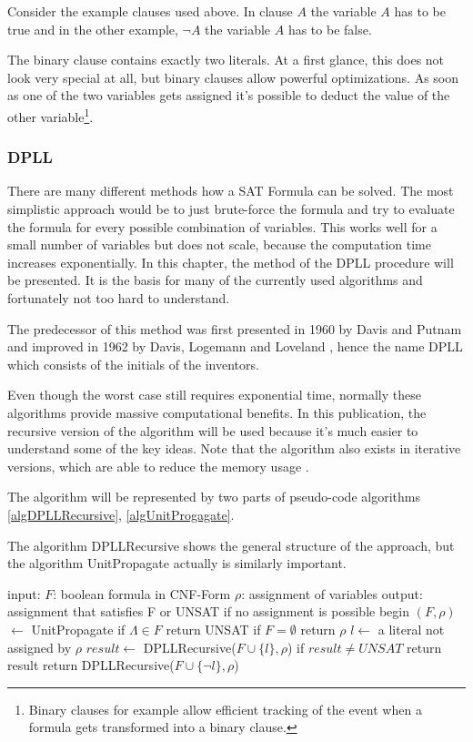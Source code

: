 Consider the example clauses used above. In clause $A$ the variable $A$ has to be true and in the other example, $\lnot A$ the variable $A$ has to be false.

The binary clause contains exactly two literals. At a first glance, this does not look very special at all, but binary clauses allow powerful optimizations. As soon as one of the two variables gets assigned it's possible to deduct the value of the other variable\footnote{Binary clauses for example allow efficient tracking of the event when a formula gets transformed into a binary clause.}.
\subsubsection{DPLL}

There are many different methods how a SAT Formula can be solved. The most simplistic approach would be to just brute-force the formula and try to evaluate the formula for every possible combination of variables. This works well for a small number of variables but does not scale, because the computation time increases exponentially. In this chapter, the method of the DPLL procedure will be presented. It is the basis for many of the currently used algorithms and fortunately not too hard to understand.

The predecessor of this method was first presented in 1960 by Davis and Putnam \cite{Davis:1960:CPQ:321033.321034} and improved in 1962 by Davis, Logemann and Loveland \cite{Davis:1962:MPT:368273.368557}, hence the name DPLL which consists of the initials of the inventors.

Even though the worst case still requires exponential time, normally these algorithms provide massive computational benefits. In this publication, the recursive version of the algorithm will be used because it's much easier to understand some of the key ideas. Note that the algorithm also exists in iterative versions, which are able to reduce the memory usage \cite{Gomes2008SatisfiabilityS}.

The algorithm will be represented by two parts of pseudo-code algorithms \ref{algDPLLRecursive}, \ref{algUnitProgagate}.

The algorithm DPLLRecursive shows the general structure of the approach, but the algorithm UnitPropagate actually is similarly important.

\begin{algorithm}[caption={DPLLRecursive}, label={algDPLLRecursive}]
 input: $F$: boolean formula in CNF-Form
	$\rho$: assignment of variables
 output: assignment that satisfies F or 
	UNSAT if no assignment is possible
 begin
   $(F, \rho)$  $\gets$ UnitPropagate
   if $\Lambda \in F$
       return UNSAT
   if $F = \emptyset$
       return $\rho$
   $l \gets$ a literal not assigned by $\rho$
   $result \gets$ DPLLRecursive($F \cup \{l\}, \rho$)
   if $result \neq UNSAT$
       return result
   return DPLLRecursive($F \cup \{\lnot l\}, \rho$)
\end{algorithm}


